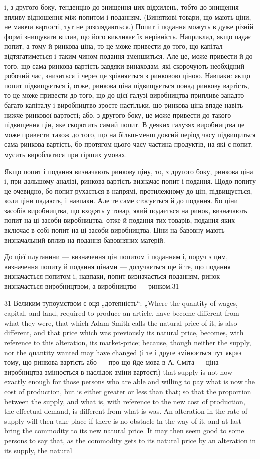 і, з другого боку, тенденцію до знищення цих відхилень, тобто
до знищення впливу відношення між попитом і поданням. (Виняткові
товари, що мають ціни, не маючи вартості, тут не розглядаються.)
Попит і подання можуть в дуже різній формі
знищувати вплив, що його викликає їх нерівність. Наприклад,
якщо падає попит, а тому й ринкова ціна, то це може привести
до того, що капітал відтягатиметься і таким чином подання
зменшиться. Але це, може привести й до того, що сама ринкова
вартість завдяки винаходам, які скорочують необхідний робочий
час, знизиться і через це зрівняється з ринковою ціною. Навпаки:
якщо попит підвищується і, отже, ринкова ціна підвищується
понад ринкову вартість, то це може привести до того,
що до цієї галузі виробництва припливе занадто багато капіталу
і виробництво зросте настільки, що ринкова ціна впаде
навіть нижче ринкової вартості; або, з другого боку, це може
привести до такого підвищення цін, яке скоротить самий попит.
В деяких галузях виробництва це може привести також до
того, що на більш-менш довгий період часу підвищиться сама
ринкова вартість, бо протягом цього часу частина продуктів,
на які є попит, мусить вироблятися при гірших умовах.

Якщо попит і подання визначають ринкову ціну, то, з другого
боку, ринкова ціна і, при дальшому аналізі, ринкова вартість
визначає попит і подання. Щодо попиту це очевидно, бо
попит рухається в напрямі, протилежному до цін, підвищується,
коли ціни падають, і навпаки. Але те саме стосується й до
подання. Бо ціни засобів виробництва, що входять у товар, який
подається на ринок, визначають попит на ці засоби виробництва,
отже й подання тих товарів, подання яких включає в собі
попит на ці засоби виробництва. Ціни на бавовну мають визначальний
вплив на подання бавовняних матерій.

До цієї плутанини — визначення цін попитом і поданням і,
поруч з цим, визначення попиту й подання цінами — долучається
ще й те, що подання визначається попитом і, навпаки,
попит визначається поданням, ринок визначається виробництвом,
а виробництво — ринком.31

31 Великим тупоумством є оця „дотепність“: „Where the quantity of wages,
capital, and land, required to produce an article, have become different from what
they were, that which Adam Smith calls the natural price of it, is also different,
and that price which was previously its natural price, becomes, with reference to
this alteration, its market-price; because, though neither the supply, nor the quantity
wanted may have changed (і те і друге змінюється тут якраз тому, що
ринкова вартість або — про що йде мова в А. Сміта — ціна виробництва змінюється
в наслідок зміни вартості) that supply is not now exactly enough for
those persons who are able and willing to pay what is now the cost of production,
but is either greater or less than that; so that the proportion between the supply,
and what is, with reference to the new cost of production, the effectual demand,
is different from what is was. An alteration in the rate of supply will then take
place if there is no obstacle іn the way of it, and at last bring the commodity
to its new natural price. It may then seem good to some persons to say that, as
the commodity gets to its natural price by an alteration in its supply, the natural
